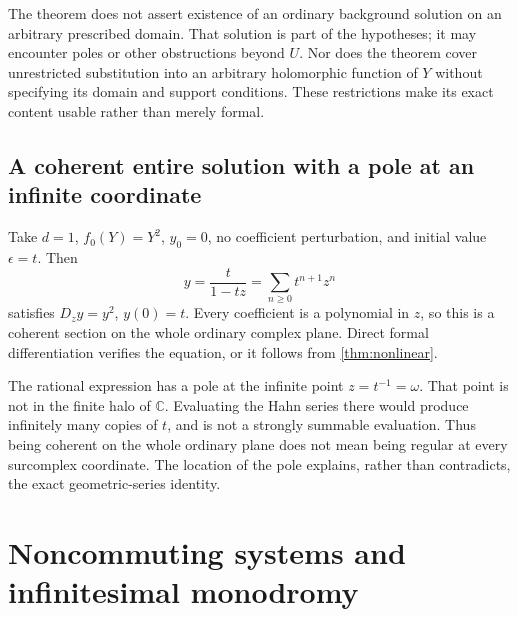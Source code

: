 \documentclass[11pt,letterpaper]{article}
\numberwithin{equation}{section}
\theoremstyle{definition}
\theoremstyle{remark}
\newcommand{\C}{\mathbb C}
\begin{document}
The theorem does not assert existence of an ordinary background solution on
an arbitrary prescribed domain. That solution is part of the hypotheses;
it may encounter poles or other obstructions beyond $U$. Nor does the
theorem cover unrestricted substitution into an arbitrary holomorphic
function of $Y$ without specifying its domain and support conditions.
These restrictions make its exact content usable rather than merely formal.

\subsection{A coherent entire solution with a pole at an infinite coordinate}
Take $d=1$, $f_0(Y)=Y^2$, $y_0=0$, no coefficient perturbation, and initial
value $\epsilon=t$. Then
\begin{equation}\label{eq:riccati}
 y=\frac{t}{1-tz}=\sum_{n\ge0}t^{n+1}z^n
\end{equation}
satisfies $D_zy=y^2$, $y(0)=t$. Every coefficient is a polynomial in $z$, so
this is a coherent section on the whole ordinary complex plane. Direct
formal differentiation verifies the equation, or it follows from
\cref{thm:nonlinear}.

The rational expression has a pole at the infinite point $z=t^{-1}=\omega$.
That point is not in the finite halo of $\C$. Evaluating the Hahn series
there would produce infinitely many copies of $t$, and is not a strongly
summable evaluation. Thus being coherent on the whole ordinary plane does
not mean being regular at every surcomplex coordinate. The location of the
pole explains, rather than contradicts, the exact geometric-series identity.

\section{Noncommuting systems and infinitesimal monodromy}
\label{sec:monodromy}
\end{document}
